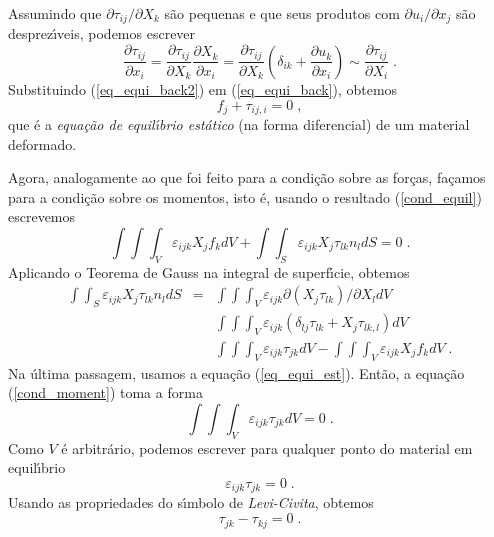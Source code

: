 Assumindo que $\partial \tau_{ij}/\partial X_k$ s\~ao pequenas e
que seus produtos com $\partial u_i/\partial x_j$ s\~ao
desprez\'{\i}veis, podemos escrever
\begin{equation}
\frac {\partial \tau_{ij}}{\partial x_i} = \frac {\partial
\tau_{ij}}{\partial X_k} \frac {\partial X_k}{\partial x_i}=\frac
{\partial \tau_{ij}}{\partial X_k} \left(
\delta_{ik}+\frac{\partial u_k}{\partial x_i} \right) \sim \frac
{\partial \tau_{ij}}{\partial X_i} \;. \label{eq_equi_back2}
\end{equation}
Substituindo (\ref{eq_equi_back2}) em
(\ref{eq_equi_back}), obtemos
\begin{equation}
f_j + \tau_{ij,i} = 0 \;, \label{eq_equi_est}
\end{equation}
que \'e a {\it equa\c{c}\~ao de equil\'{\i}brio est\'atico} (na
forma diferencial) de um material deformado.

Agora, analogamente ao que foi feito para a condi\c{c}\~ao sobre
as for\c{c}as, fa\c{c}amos para a condi\c{c}\~ao sobre os
momentos, isto \'e, usando o resultado (\ref{cond_equil})
escrevemos
\begin{equation}
\int \!\! \int \!\! \int_V \varepsilon_{ijk} X_j f_k dV + \int
\!\! \int_S \varepsilon_{ijk} X_j \tau_{lk}n_l dS = 0 \;.
\label{cond_moment}
\end{equation}
Aplicando o Teorema de Gauss na integral de superf\'{\i}cie,
obtemos
\begin{equation}
\begin{array}{rcl}
\int \!\! \int_S \varepsilon_{ijk} X_j \tau_{lk}n_l dS &=& \int
\!\! \int \!\! \int_V  \varepsilon_{ijk} \partial (X_j
\tau_{lk})/\partial X_l dV  \\
&& \int \!\! \int \!\! \int_V  \varepsilon_{ijk} (\delta_{lj} \tau_{lk} + X_j \tau_{lk,l}) dV \\
&& \int \!\! \int \!\! \int_V  \varepsilon_{ijk} \tau_{jk} dV -
\int \!\! \int \!\! \int_V  \varepsilon_{ijk} X_j f_k dV \;.
\end{array}
\end{equation}
Na \'ultima passagem, usamos a equa\c{c}\~ao (\ref{eq_equi_est}).
Ent\~ao, a equa\c{c}\~ao (\ref{cond_moment}) toma a forma
\begin{equation}
\int \!\! \int \!\! \int_V  \varepsilon_{ijk} \tau_{jk} dV =0\;.
\label{cond_moment1}
\end{equation}
Como $V$ \'e arbitr\'ario, podemos escrever para qualquer ponto do
material em equil\'{\i}brio
\begin{equation}
\varepsilon_{ijk} \tau_{jk}=0\;.
\end{equation}
Usando as propriedades do s\'{\i}mbolo de {\it Levi-Civita},
obtemos
\begin{equation}
\tau_{jk}-\tau_{kj}=0\;.
\end{equation}

